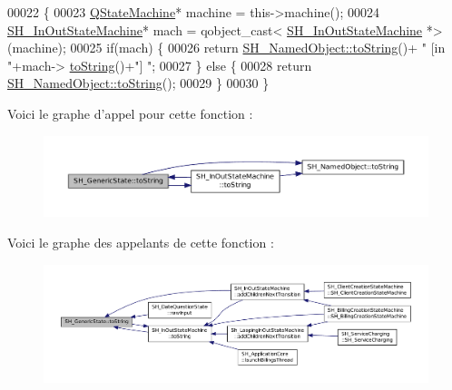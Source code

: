 \begin{DoxyCode}
00022 \{
00023     \hyperlink{classQStateMachine}{QStateMachine}* machine = this->machine();
00024     \hyperlink{classSH__InOutStateMachine}{SH\_InOutStateMachine}* mach = qobject\_cast<
      \hyperlink{classSH__InOutStateMachine}{SH\_InOutStateMachine} *>(machine);
00025     \textcolor{keywordflow}{if}(mach) \{
00026         \textcolor{keywordflow}{return} \hyperlink{classSH__NamedObject_af73e97f6476ca1ef3a22b159d179f5e7}{SH\_NamedObject::toString}()+ \textcolor{stringliteral}{" [in "}+mach->
      \hyperlink{classSH__InOutStateMachine_a60ecd7de03d948e2d1e9cbedb5c3e5fa}{toString}()+\textcolor{stringliteral}{"] "};
00027     \} \textcolor{keywordflow}{else} \{
00028         \textcolor{keywordflow}{return} \hyperlink{classSH__NamedObject_af73e97f6476ca1ef3a22b159d179f5e7}{SH\_NamedObject::toString}();
00029     \}
00030 \}
\end{DoxyCode}


Voici le graphe d'appel pour cette fonction \-:\nopagebreak
\begin{figure}[H]
\begin{center}
\leavevmode
\includegraphics[width=350pt]{classSH__GenericState_a5480c5ee725fd801d8f6292cd4c803b8_cgraph}
\end{center}
\end{figure}




Voici le graphe des appelants de cette fonction \-:\nopagebreak
\begin{figure}[H]
\begin{center}
\leavevmode
\includegraphics[width=350pt]{classSH__GenericState_a5480c5ee725fd801d8f6292cd4c803b8_icgraph}
\end{center}
\end{figure}


